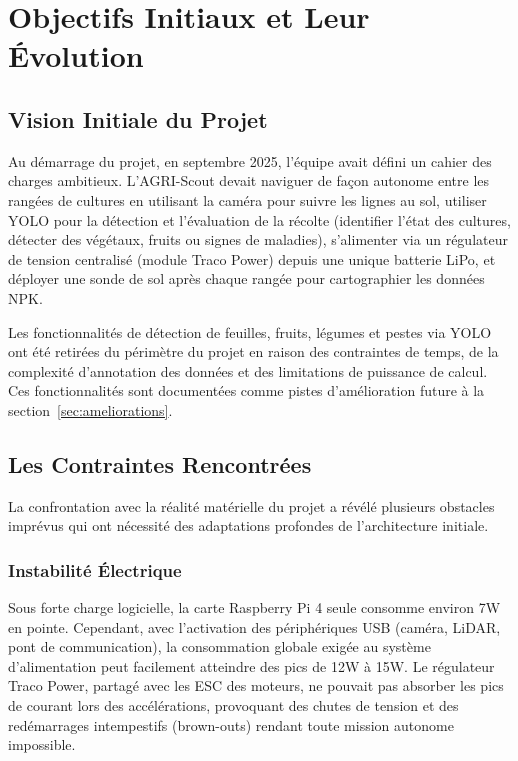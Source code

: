 \section{Objectifs Initiaux et Leur Évolution}

\subsection{Vision Initiale du Projet}

Au démarrage du projet, en septembre 2025, l'équipe avait défini un cahier des charges ambitieux. L'AGRI-Scout devait naviguer de façon autonome entre les rangées de cultures en utilisant la caméra pour suivre les lignes au sol, utiliser YOLO pour la détection et l'évaluation de la récolte (identifier l'état des cultures, détecter des végétaux, fruits ou signes de maladies), s'alimenter via un régulateur de tension centralisé (module Traco Power) depuis une unique batterie LiPo, et déployer une sonde de sol après chaque rangée pour cartographier les données NPK.

Les fonctionnalités de détection de feuilles, fruits, légumes et pestes via YOLO ont été retirées du périmètre du projet en raison des contraintes de temps, de la complexité d'annotation des données et des limitations de puissance de calcul. Ces fonctionnalités sont documentées comme pistes d'amélioration future à la section~\ref{sec:ameliorations}.

\subsection{Les Contraintes Rencontrées}

La confrontation avec la réalité matérielle du projet a révélé plusieurs obstacles imprévus qui ont nécessité des adaptations profondes de l'architecture initiale.

\subsubsection{Instabilité Électrique}

Sous forte charge logicielle, la carte Raspberry Pi 4 seule consomme environ 7W en pointe. Cependant, avec l'activation des périphériques USB (caméra, LiDAR, pont de communication), la consommation globale exigée au système d'alimentation peut facilement atteindre des pics de 12W à 15W.
 Le régulateur Traco Power, partagé avec les ESC des moteurs, ne pouvait pas absorber les pics de courant lors des accélérations, provoquant des chutes de tension et des redémarrages intempestifs (brown-outs) rendant toute mission autonome impossible.

